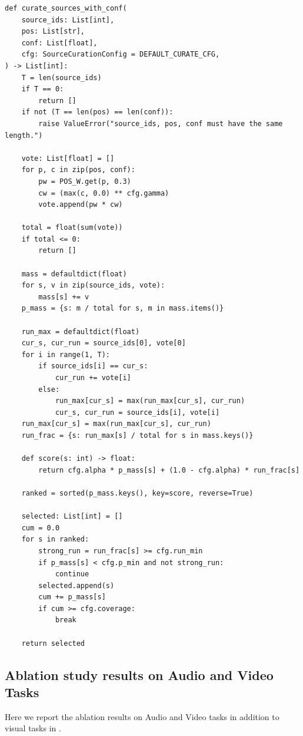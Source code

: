 \begin{lstlisting}
def curate_sources_with_conf(
    source_ids: List[int],
    pos: List[str],
    conf: List[float],
    cfg: SourceCurationConfig = DEFAULT_CURATE_CFG,
) -> List[int]:
    T = len(source_ids)
    if T == 0:
        return []
    if not (T == len(pos) == len(conf)):
        raise ValueError("source_ids, pos, conf must have the same length.")

    vote: List[float] = []
    for p, c in zip(pos, conf):
        pw = POS_W.get(p, 0.3)
        cw = (max(c, 0.0) ** cfg.gamma)
        vote.append(pw * cw)

    total = float(sum(vote))
    if total <= 0:
        return []

    mass = defaultdict(float)
    for s, v in zip(source_ids, vote):
        mass[s] += v
    p_mass = {s: m / total for s, m in mass.items()}

    run_max = defaultdict(float)
    cur_s, cur_run = source_ids[0], vote[0]
    for i in range(1, T):
        if source_ids[i] == cur_s:
            cur_run += vote[i]
        else:
            run_max[cur_s] = max(run_max[cur_s], cur_run)
            cur_s, cur_run = source_ids[i], vote[i]
    run_max[cur_s] = max(run_max[cur_s], cur_run)
    run_frac = {s: run_max[s] / total for s in mass.keys()}

    def score(s: int) -> float:
        return cfg.alpha * p_mass[s] + (1.0 - cfg.alpha) * run_frac[s]

    ranked = sorted(p_mass.keys(), key=score, reverse=True)

    selected: List[int] = []
    cum = 0.0
    for s in ranked:
        strong_run = run_frac[s] >= cfg.run_min
        if p_mass[s] < cfg.p_min and not strong_run:
            continue
        selected.append(s)
        cum += p_mass[s]
        if cum >= cfg.coverage:
            break

    return selected

\end{lstlisting}

\subsection{Ablation study results on Audio and Video Tasks}
\label{appendix:ablation_filtering_audio_video}

Here we report the ablation results on Audio and Video tasks in addition to visual tasks in .



